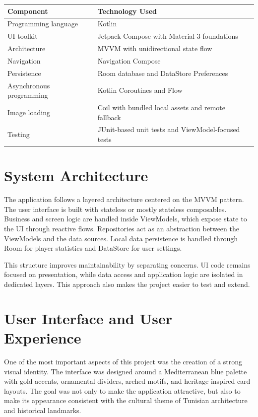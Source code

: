 \documentclass[12pt,a4paper]{article}
\begin{document}
\begin{center}
\begin{tabularx}{\textwidth}{|l|X|}
\hline
\textbf{Component} & \textbf{Technology Used} \\
\hline
Programming language & Kotlin \\
\hline
UI toolkit & Jetpack Compose with Material 3 foundations \\
\hline
Architecture & MVVM with unidirectional state flow \\
\hline
Navigation & Navigation Compose \\
\hline
Persistence & Room database and DataStore Preferences \\
\hline
Asynchronous programming & Kotlin Coroutines and Flow \\
\hline
Image loading & Coil with bundled local assets and remote fallback \\
\hline
Testing & JUnit-based unit tests and ViewModel-focused tests \\
\hline
\end{tabularx}
\end{center}

\section{System Architecture}
The application follows a layered architecture centered on the MVVM pattern. The user interface is built with stateless or mostly stateless composables. Business and screen logic are handled inside ViewModels, which expose state to the UI through reactive flows. Repositories act as an abstraction between the ViewModels and the data sources. Local data persistence is handled through Room for player statistics and DataStore for user settings.

This structure improves maintainability by separating concerns. UI code remains focused on presentation, while data access and application logic are isolated in dedicated layers. This approach also makes the project easier to test and extend.

\section{User Interface and User Experience}
One of the most important aspects of this project was the creation of a strong visual identity. The interface was designed around a Mediterranean blue palette with gold accents, ornamental dividers, arched motifs, and heritage-inspired card layouts. The goal was not only to make the application attractive, but also to make its appearance consistent with the cultural theme of Tunisian architecture and historical landmarks.
\end{document}
